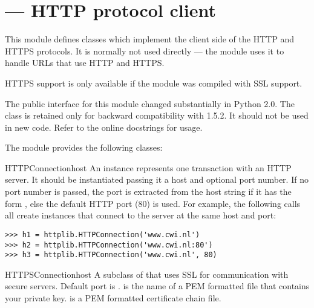 \section{ ---
         HTTP protocol client}



This module defines classes which implement the client side of the
HTTP and HTTPS protocols.  It is normally not used directly --- the
module  uses it to handle URLs
that use HTTP and HTTPS.

\begin{notice}
  HTTPS support is only available if the  module was
  compiled with SSL support.
\end{notice}

\begin{notice}
  The public interface for this module changed substantially in Python
  2.0.  The  class is retained only for backward
  compatibility with 1.5.2.  It should not be used in new code.  Refer
  to the online docstrings for usage.
\end{notice}

The module provides the following classes:

\begin{classdesc}{HTTPConnection}{host}
An  instance represents one transaction with an HTTP
server.  It should be instantiated passing it a host and optional port number.
If no port number is passed, the port is extracted from the host string if it
has the form , else the default HTTP port (80) is
used.  For example, the following calls all create instances that connect to
the server at the same host and port:

\begin{verbatim}
>>> h1 = httplib.HTTPConnection('www.cwi.nl')
>>> h2 = httplib.HTTPConnection('www.cwi.nl:80')
>>> h3 = httplib.HTTPConnection('www.cwi.nl', 80)
\end{verbatim}
\end{classdesc}

\begin{classdesc}{HTTPSConnection}{host}
A subclass of  that uses SSL for communication with
secure servers.  Default port is .
 is
the name of a PEM formatted file that contains your private
key.  is a PEM formatted certificate chain file.


\end{classdesc}

